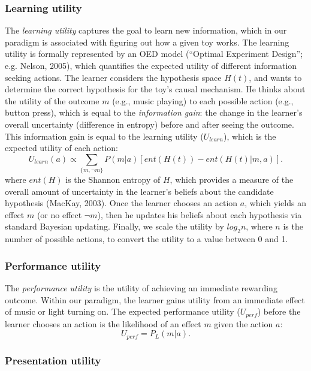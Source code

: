 \documentclass[10pt, letterpaper]{article}
\begin{document}
\subsubsection{Learning utility}\label{learning-utility}

The \emph{learning utility} captures the goal to learn new information,
which in our paradigm is associated with figuring out how a given toy
works. The learning utility is formally represented by an OED model
(``Optimal Experiment Design''; e.g. Nelson, 2005), which quantifies the
expected utility of different information seeking actions. The learner
considers the hypothesis space \(H(t)\), and wants to determine the
correct hypothesis for the toy's causal mechanism. He thinks about the
utility of the outcome \(m\) (e.g., music playing) to each possible
action (e.g., button press), which is equal to the \emph{information
gain}: the change in the learner's overall uncertainty (difference in
entropy) before and after seeing the outcome. This information gain is
equal to the learning utility (\(U_{learn}\)), which is the expected
utility of each action:
\[ U_{learn}(a) \propto \sum_{\{m, \neg m\}}{P(m|a)}[{ent(H(t)) - ent(H(t)|m,a)}].\]
\noindent
where \(ent(H)\) is the Shannon entropy of \(H\), which provides a
measure of the overall amount of uncertainty in the learner's beliefs
about the candidate hypothesis (MacKay, 2003). Once the learner chooses
an action \(a\), which yields an effect \(m\) (or no effect \(\neg m\)),
then he updates his beliefs about each hypothesis via standard Bayesian
updating. Finally, we scale the utility by \(log_2n\), where \(n\) is
the number of possible actions, to convert the utility to a value
between 0 and 1.

\subsubsection{Performance utility}\label{performance-utility}

The \emph{performance utility} is the utility of achieving an immediate
rewarding outcome. Within our paradigm, the learner gains utility from
an immediate effect of music or light turning on. The expected
performance utility (\(U_{perf}\)) before the learner chooses an action
is the likelihood of an effect \(m\) given the action \(a\):
\[ U_{perf} = P_L(m | a).\] \noindent

\subsubsection{Presentation utility}\label{presentation-utility}
\end{document}

